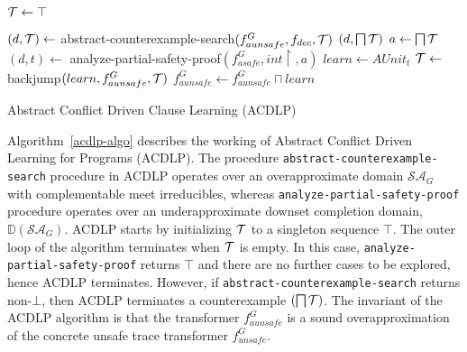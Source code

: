 {\begin{algorithm2e}[t]
\DontPrintSemicolon
{}
\begin{small}
        
	$\mathcal{T} \leftarrow \top$ \;

	 {
	   $(d,\mathcal{T}) \leftarrow$ abstract-counterexample-search$(f_{aunsafe}^G,f_{dec},\mathcal{T})$ \;
	    {\return $(d,\bigsqcap \mathcal{T})$} 
	   $a \leftarrow \bigsqcap \mathcal{T}$ \; 
	   $(d,{t}) \leftarrow$ analyze-partial-safety-proof$(f_{asafe}^G,int \upharpoonright, a)$ \;
	   $learn \leftarrow AUnit_{t}$ \;
	   $\mathcal{T} \leftarrow$ backjump$(learn,f_{aunsafe}^G,\mathcal{T})$ \;
	   $f_{aunsafe}^G \leftarrow f_{aunsafe}^G \sqcap learn$ \;
	}
	{\return \rmcmt{$\bot$}}
\end{small}
	\caption{Abstract Conflict Driven Clause Learning (ACDLP) \label{acdlp-algo}}
\end{algorithm2e}
%
Algorithm~\ref{acdlp-algo} describes the working of Abstract Conflict Driven Learning for Programs (ACDLP).  
The procedure \texttt{abstract-counterexample-search} procedure in ACDLP operates over an overapproximate domain $\mathcal{SA}_G$ 
with complementable meet irreducibles, whereas \texttt{analyze-partial-safety-proof} procedure operates over an 
underapproximate downset completion domain, $\mathbb{D}(\mathcal{SA}_G)$.  ACDLP starts by initializing $\mathcal{T}$ to 
a singleton sequence $\top$. The outer loop of the algorithm terminates when $\mathcal{T}$ is empty. In this case, 
\texttt{analyze-partial-safety-proof} returns $\top$ and there are no further cases to be explored, hence ACDLP 
terminates.  However, if \texttt{abstract-counterexample-search} returns non-$\bot$, then ACDLP terminates a 
counterexample $(\bigsqcap \mathcal{T})$.  The invariant of the ACDLP algorithm is that the transformer 
$f_{aunsafe}^G$ is a sound overapproximation of the concrete unsafe trace transformer $f_{unsafe}^G$.


}
